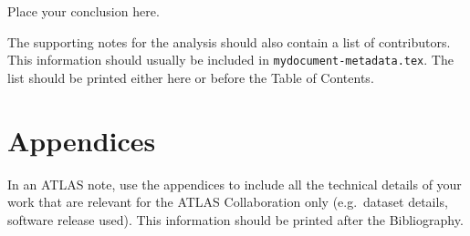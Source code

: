 \documentclass[NOTE, atlasdraft=true, texlive=2016, UKenglish]{\ATLASLATEXPATH atlasdoc}
\begin{document}
Place your conclusion here.


\printbibliography
%
%

\clearpage
The supporting notes for the analysis should also contain a list of contributors.
This information should usually be included in \texttt{mydocument-metadata.tex}.
The list should be printed either here or before the Table of Contents.


\clearpage
\appendix
\part*{Appendices}

\clearpage

In an ATLAS note, use the appendices to include all the technical details of your work
that are relevant for the ATLAS Collaboration only (e.g.\ dataset details, software release used).
This information should be printed after the Bibliography.
\end{document}

